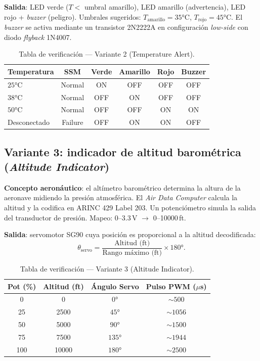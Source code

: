\documentclass[11pt]{article}
\begin{document}
\textbf{Salida}: LED verde ($T<$ umbral amarillo), LED amarillo (advertencia), LED rojo
+ \emph{buzzer} (peligro). Umbrales sugeridos: $T_\text{amarillo}=35\si{\celsius}$,
$T_\text{rojo}=45\si{\celsius}$. El \emph{buzzer} se activa mediante un transistor
2N2222A en configuración \emph{low-side} con diodo \emph{flyback} 1N4007.

\begin{table}[H]\centering
\caption{Tabla de verificación — Variante 2 (Temperature Alert).}
\begin{tabular}{lccccc}
\toprule
Temperatura & SSM & Verde & Amarillo & Rojo & Buzzer \\
\midrule
$25\si{\celsius}$ & Normal & ON & OFF & OFF & OFF \\
$38\si{\celsius}$ & Normal & OFF & ON & OFF & OFF \\
$50\si{\celsius}$ & Normal & OFF & OFF & ON & ON \\
Desconectado & Failure & OFF & ON & ON & OFF \\
\bottomrule
\end{tabular}
\end{table}

\subsection{Variante 3: indicador de altitud barométrica (\emph{Altitude Indicator})}
\textbf{Concepto aeronáutico}: el altímetro barométrico determina la altura de la
aeronave midiendo la presión atmosférica. El \emph{Air Data Computer} calcula la altitud
y la codifica en ARINC 429 Label 203. Un potenciómetro simula la salida del transductor
de presión. Mapeo: 0--3.3\,V $\to$ 0--10000\,ft.

\textbf{Salida}: servomotor SG90 cuya posición es proporcional a la altitud decodificada:
\begin{equation}
  \theta_\text{servo} = \frac{\text{Altitud (ft)}}{\text{Rango máximo (ft)}}\times 180\si{\degree}.
\end{equation}

\begin{table}[H]\centering
\caption{Tabla de verificación — Variante 3 (Altitude Indicator).}
\begin{tabular}{cccc}
\toprule
Pot (\%) & Altitud (ft) & Ángulo Servo & Pulso PWM ($\mu$s) \\
\midrule
0 & 0 & $0\si{\degree}$ & $\sim 500$ \\
25 & 2500 & $45\si{\degree}$ & $\sim 1056$ \\
50 & 5000 & $90\si{\degree}$ & $\sim 1500$ \\
75 & 7500 & $135\si{\degree}$ & $\sim 1944$ \\
100 & 10000 & $180\si{\degree}$ & $\sim 2500$ \\
\bottomrule
\end{tabular}
\end{table}
\end{document}
